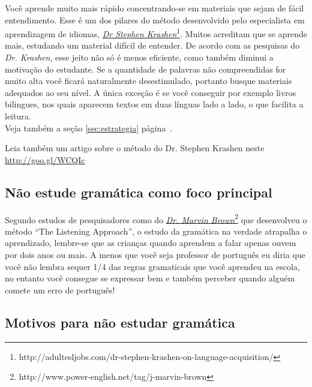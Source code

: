 \vspace{0.3\baselineskip} \noindent Você aprende muito mais rápido concentrando-se em
materiais que sejam de fácil entendimento. Esse é um dos pilares do método
desenvolvido pelo especialista em aprendizagem de idiomas, 
\href{http://adultesljobs.com/dr-stephen-krashen-on-language-acquisition/}{{\em
Dr Stephen
Krashen}}\footnote{http://adultesljobs.com/dr-stephen-krashen-on-language-acquisition/}.
Muitos acreditam que se aprende mais, estudando um material difícil de
entender.  De acordo com as pesquisas do {\em Dr. Krashen}, esse jeito não só
é menos eficiente, como também diminui a motivação do estudante.  Se
a quantidade de palavras não compreendidas for muito alta você ficará
naturalmente desestimulado, portanto busque materiais adequados ao seu nível. A única exceção é se você conseguir por exemplo livros bilingues, nos quais aparecem textos em duas línguas lado a lado, o que facilita a leitura. \\

\noindent
\vspace{0.3\baselineskip}
{\footnotesize {} Veja também a seção \ref{sec:estrategia} página~\pageref{sec:estrategia}.}

\noindent
{\footnotesize {} Leia também um artigo sobre o método do Dr.  Stephen Krashen neste
 \href{http://www.readability.com/articles/vdzq7x1o}{http://goo.gl/WCQIc}}

\subsection{Não estude gramática como foco principal}

Segundo estudos de pesquisadores como do 
\href{http://www.power-english.net/tag/j-marvin-brown}{{\em Dr. Marvin
Brown}}\footnote{http://www.power-english.net/tag/j-marvin-brown} que
desenvolveu o método  ``The
Listening Approach'', o estudo da gramática na verdade atrapalha o aprendizado,
lembre-se que as crianças quando aprendem a falar apenas ouvem por dois anos ou
mais.  A menos que você seja professor de português eu diria que você não
lembra sequer 1/4 das regras gramaticais que você aprendeu na
escola, no entanto você consegue se expressar bem e também perceber quando
alguém comete um erro de português!

\subsection{Motivos para não estudar gramática}\label{sub:not-grammar}

